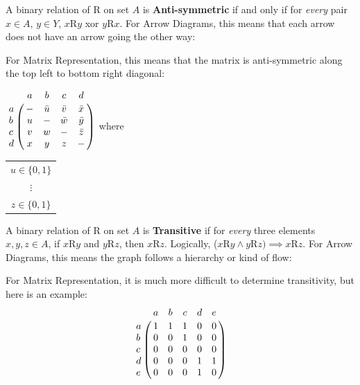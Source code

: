 A binary relation of R on set $A$ is \textbf{Anti-symmetric} if and only if for \textit{every} pair $x \in A$, $y \in Y$, $x$R$y$ xor $y$R$x$.
For Arrow Diagrams, this means that each arrow does not have an arrow going the other way:
\begin{center}
\end{center}
For Matrix Representation, this means that the matrix is anti-symmetric along the top left to bottom right diagonal:
\begin{center}
  $
    \bordermatrix{ & a & b & c & d \cr
      a & - & \bar{u} & \bar{v} & \bar{x} \cr
      b & u & - & \bar{w} & \bar{y} \cr
      c & v & w & - & \bar{z} \cr
      d & x & y & z & - \cr }
  $
  where
  \begin{tabular}{c}
    $u \in \{0,1\}$ \\
    $\vdots$        \\
    $z \in \{0,1\}$
  \end{tabular}
\end{center}

A binary relation of R on set $A$ is \textbf{Transitive} if for \textit{every} three elements $x,y,z \in A$,
if $x$R$y$ and $y$R$z$, then $x$R$z$. Logically, ($x$R$y \land y$R$z) \implies x$R$z$.
For Arrow Diagrams, this means the graph follows a hierarchy or kind of flow:
\begin{center}
\end{center}
For Matrix Representation, it is much more difficult to determine transitivity, but here is an example:
\[
  \bordermatrix{ & a & b & c & d & e \cr
    a & 1 & 1 & 1 & 0 & 0 \cr
    b & 0 & 0 & 1 & 0 & 0 \cr
    c & 0 & 0 & 0 & 0 & 0 \cr
    d & 0 & 0 & 0 & 1 & 1 \cr
    e & 0 & 0 & 0 & 1 & 0 \cr }
\]

